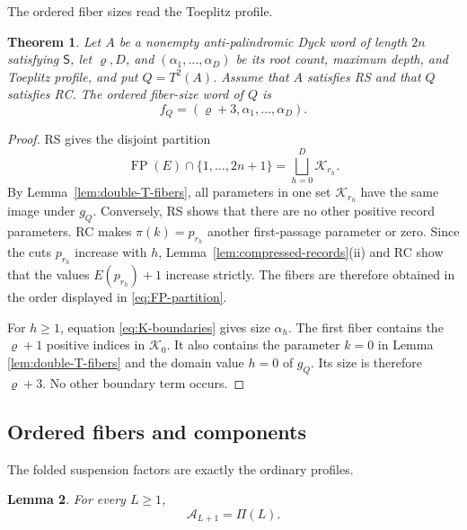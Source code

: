 \documentclass[11pt]{article}
\newtheorem{theorem}{Theorem}[section]
\newtheorem{lemma}[theorem]{Lemma}
\theoremstyle{definition}
\theoremstyle{remark}
\DeclareMathOperator{\FP}{FP}
\begin{document}
The ordered fiber sizes read the Toeplitz profile.
\begin{theorem}
\label{thm:fiber-toeplitz}
Let \(A\) be a nonempty anti-palindromic Dyck word of length \(2n\) satisfying
\(\mathsf S\), let \(\varrho,D\), and
\((\alpha_1,\ldots,\alpha_D)\) be its root count, maximum depth, and Toeplitz
profile, and put \(Q=T^2(A)\).  Assume that \(A\) satisfies RS and that \(Q\)
satisfies RC.  The
ordered fiber-size word of \(Q\) is
\begin{equation*}
 f_Q=(\varrho+3,\alpha_1,\ldots,\alpha_D).
\end{equation*}
\end{theorem}

\begin{proof}
RS gives the disjoint partition
\begin{equation}
\label{eq:FP-partition}
 \FP(E)\cap\{1,\ldots,2n+1\}
 =\bigsqcup_{h=0}^{D}\mathcal K_{r_h}.
\end{equation}
By Lemma~\ref{lem:double-T-fibers}, all parameters in one set
\(\mathcal K_{r_h}\) have the same image under \(g_Q\).  Conversely, RS
shows that there are no other positive record parameters.  RC makes
\(\pi(k)=p_{r_h}\) another first-passage parameter or zero.  Since the cuts
\(p_{r_h}\) increase with \(h\), Lemma~\ref{lem:compressed-records}(ii) and
RC show that the values \(E(p_{r_h})+1\) increase strictly.  The fibers are therefore obtained in the order displayed in
\eqref{eq:FP-partition}.

For \(h\geq1\), equation \eqref{eq:K-boundaries} gives size \(\alpha_h\).
The first fiber contains the \(\varrho+1\) positive indices in
\(\mathcal K_0\).  It also contains the parameter \(k=0\) in Lemma
\ref{lem:double-T-fibers} and the domain value \(h=0\) of \(g_Q\).  Its size
is therefore \(\varrho+3\).  No other boundary term occurs.
\end{proof}

\subsection{Ordered fibers and components}

The folded suspension factors are exactly the ordinary profiles.
\begin{lemma}
\label{lem:ordinary-fold}
For every \(L\geq1\),
\begin{equation*}
 \mathcal A_{L+1}=\Pi(L).
\end{equation*}
\end{lemma}
\end{document}
